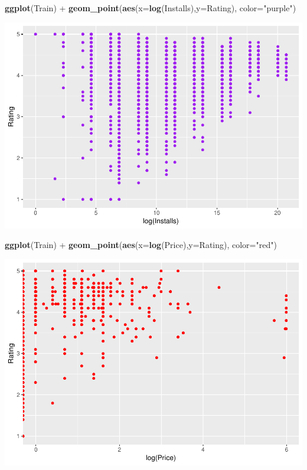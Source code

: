 \documentclass[]{article}
\newenvironment{Shaded}{\begin{snugshade}}{\end{snugshade}}
\newcommand{\KeywordTok}[1]{\textcolor[rgb]{0.13,0.29,0.53}{\textbf{{#1}}}}
\newcommand{\DataTypeTok}[1]{\textcolor[rgb]{0.13,0.29,0.53}{{#1}}}
\newcommand{\StringTok}[1]{\textcolor[rgb]{0.31,0.60,0.02}{{#1}}}
\newcommand{\NormalTok}[1]{{#1}}
\begin{document}
\begin{Shaded}
\begin{Highlighting}[]
\KeywordTok{ggplot}\NormalTok{(Train) +}\StringTok{ }\KeywordTok{geom_point}\NormalTok{(}\KeywordTok{aes}\NormalTok{(}\DataTypeTok{x=}\KeywordTok{log}\NormalTok{(Installs),}\DataTypeTok{y=}\NormalTok{Rating), }\DataTypeTok{color=}\StringTok{"purple"}\NormalTok{)}
\end{Highlighting}
\end{Shaded}

\includegraphics{Project_2_Work_files/figure-latex/unnamed-chunk-16-3.pdf}

\begin{Shaded}
\begin{Highlighting}[]
\KeywordTok{ggplot}\NormalTok{(Train) +}\StringTok{ }\KeywordTok{geom_point}\NormalTok{(}\KeywordTok{aes}\NormalTok{(}\DataTypeTok{x=}\KeywordTok{log}\NormalTok{(Price),}\DataTypeTok{y=}\NormalTok{Rating), }\DataTypeTok{color=}\StringTok{"red"}\NormalTok{)}
\end{Highlighting}
\end{Shaded}

\includegraphics{Project_2_Work_files/figure-latex/unnamed-chunk-16-4.pdf}
\end{document}
